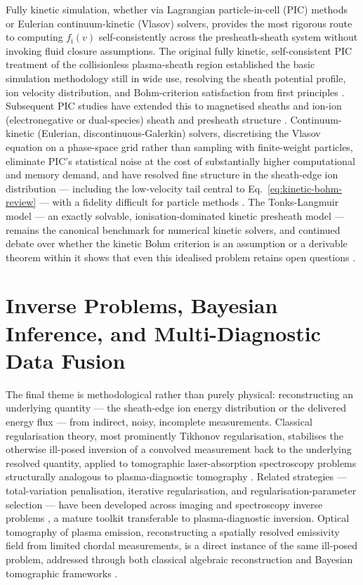 Fully kinetic simulation, whether via Lagrangian particle-in-cell (PIC) methods or Eulerian continuum-kinetic (Vlasov) solvers, provides the most rigorous route to computing $f_{\mathrm{i}}(v)$ self-consistently across the presheath-sheath system without invoking fluid closure assumptions. The original fully kinetic, self-consistent PIC treatment of the collisionless plasma-sheath region established the basic simulation methodology still in wide use, resolving the sheath potential profile, ion velocity distribution, and Bohm-criterion satisfaction from first principles \cite{ref0631}. Subsequent PIC studies have extended this to magnetised sheaths \cite{ref0633} and ion-ion (electronegative or dual-species) sheath and presheath structure \cite{ref0655}. Continuum-kinetic (Eulerian, discontinuous-Galerkin) solvers, discretising the Vlasov equation on a phase-space grid rather than sampling with finite-weight particles, eliminate PIC's statistical noise at the cost of substantially higher computational and memory demand, and have resolved fine structure in the sheath-edge ion distribution — including the low-velocity tail central to Eq.~\eqref{eq:kinetic-bohm-review} — with a fidelity difficult for particle methods \cite{ref0659}. The Tonks-Langmuir model — an exactly solvable, ionisation-dominated kinetic presheath model — remains the canonical benchmark for numerical kinetic solvers, and continued debate over whether the kinetic Bohm criterion is an assumption or a derivable theorem within it shows that even this idealised problem retains open questions \cite{ref0665,ref0666}.

\section{Inverse Problems, Bayesian Inference, and Multi-Diagnostic Data Fusion}

The final theme is methodological rather than purely physical: reconstructing an underlying quantity — the sheath-edge ion energy distribution or the delivered energy flux — from indirect, noisy, incomplete measurements. Classical regularisation theory, most prominently Tikhonov regularisation, stabilises the otherwise ill-posed inversion of a convolved measurement back to the underlying resolved quantity, applied to tomographic laser-absorption spectroscopy problems structurally analogous to plasma-diagnostic tomography \cite{ref0677}. Related strategies — total-variation penalisation, iterative regularisation, and regularisation-parameter selection — have been developed across imaging and spectroscopy inverse problems \cite{ref0692}, a mature toolkit transferable to plasma-diagnostic inversion. Optical tomography of plasma emission, reconstructing a spatially resolved emissivity field from limited chordal measurements, is a direct instance of the same ill-posed problem, addressed through both classical algebraic reconstruction and Bayesian tomographic frameworks \cite{ref0685}.

